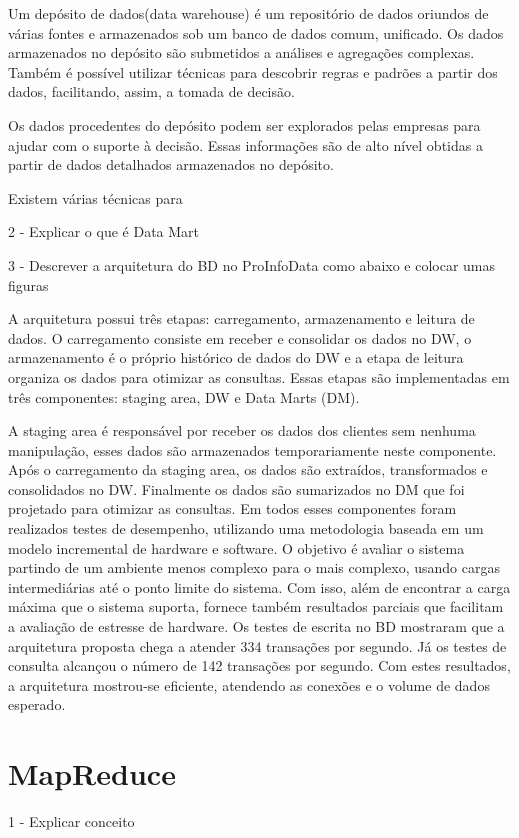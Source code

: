 \documentclass[a4paper,12pt]{article}
\begin{document}
Um depósito de dados(data warehouse) é um repositório de dados oriundos de
várias fontes e armazenados sob um banco de dados comum, unificado. Os
dados armazenados no depósito são submetidos a análises e agregações
complexas. Também é possível utilizar técnicas para descobrir regras e
padrões a partir dos dados, facilitando, assim, a tomada de decisão.

Os dados procedentes do depósito podem ser explorados pelas empresas para
ajudar com o suporte à decisão. Essas informações são de alto nível obtidas a partir de dados detalhados armazenados no depósito.

Existem várias técnicas para 

2 - Explicar o que é Data Mart 

3 - Descrever a arquitetura do BD no ProInfoData como abaixo e colocar umas figuras

A arquitetura possui três etapas: carregamento, armazenamento e leitura de dados.
O carregamento consiste em receber e consolidar os dados no DW, o armazenamento é o
próprio histórico de dados do DW e a etapa de leitura organiza os dados para otimizar 
as consultas. Essas etapas são implementadas em três componentes: staging area,
DW e Data Marts (DM).


A staging area é responsável por receber os dados dos clientes sem nenhuma manipulação, 
esses dados são armazenados temporariamente neste componente. Após o carregamento da 
staging area, os dados são extraídos, transformados e consolidados no DW. Finalmente os
dados são sumarizados no DM que foi projetado para otimizar as consultas. Em todos 
esses componentes foram realizados testes de desempenho, utilizando uma metodologia 
baseada em um modelo incremental de hardware e software. O objetivo é avaliar o sistema
 partindo de um ambiente menos complexo para o mais complexo, usando cargas
 intermediárias até o ponto limite do sistema. Com isso, além de encontrar a carga 
máxima que o sistema suporta, fornece também resultados parciais que facilitam a
 avaliação de estresse de hardware.  Os testes de escrita no BD mostraram que a 
arquitetura proposta chega a atender 334 transações por segundo. Já os testes de 
consulta alcançou o número de 142 transações por segundo. Com estes resultados, a
 arquitetura mostrou-se eficiente, atendendo as conexões e o volume de dados esperado.

\section{\textbf{MapReduce}}
1 - Explicar conceito
\end{document}
